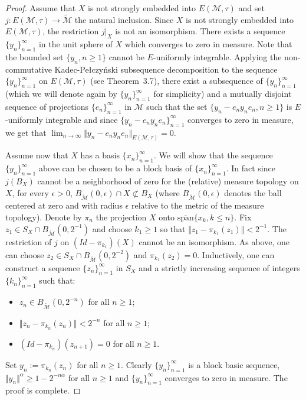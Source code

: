 \documentclass[12pt]{amsart}
\let\cal\mathcal
\def\m{{\cal M}}
\def\mt{\widetilde{\cal M}}
\def\nmt{\widetilde {\cal M}}
\numberwithin{equation}{section}
\numberwithin{theorem}{section}
\begin{document}
\begin{proof} Assume that $X$ is not strongly embedded into $E(\m,\tau)$
and set $j: E(\m,\tau) \rightarrow \nmt$ the natural inclusion.
Since $X$ is not strongly embedded into $E(\m,\tau)$, the restriction
$j\vert_{X}$ is not an isomorphism. There exists a sequence 
$\{y_n\}_{n=1}^\infty$ in
the unit sphere of $X$ which converges to zero in measure.
Note that the bounded set $\{y_n, n\geq 1\}$ cannot be $E$-uniformly integrable.
Applying the non-commutative Kadec-Pe\l czy\'nski subsequence 
decomposition to the sequence $\{y_n\}_{n=1}^\infty$ on  $E(\m,\tau)$ (see 
\cite{Ran10} Theorem~3.7), there exist a 
subsequence of $\{y_n\}_{n=1}^\infty$ 
(which we will denote again by $\{y_n\}_{n=1}^\infty$ for simplicity) and a mutually
disjoint sequence of projections $\{e_n\}_{n=1}^\infty$ in $\m$ such that
the set
$\{y_n -e_ny_ne_n, n\geq 1\}$ is $E$-uniformly integrable and since 
$\{y_n -e_ny_ne_n\}_{n=1}^\infty$ converges to zero in measure, we get that
$\lim_{n\to \infty} \Vert y_n-e_ny_ne_n\Vert_{E(\m,\tau)}=0$.

Assume now that $X$ has a basis $\{x_n\}_{n=1}^\infty$. We will show that the
sequence $\{y_n\}_{n=1}^\infty$ above can be chosen to be a block basis
 of $\{x_n\}_{n=1}^\infty$.
In fact since $j(B_X)$ cannot be a neighborhood of zero for the (relative)
measure topology on $X$, for every $\epsilon>0$,
$B_{\mt}(0,\epsilon) \cap X \not\subset B_X$ (where $B_{\mt}(0,\epsilon)$ denotes
the ball centered at zero and with radius $\epsilon$ relative to the metric
of the measure topology). Denote by $\pi_n$ the projection $X$ onto 
$\overline{\text{span}}\{ x_k, k\leq n\}$.
Fix $z_1 \in S_X \cap B_{\mt}(0, 2^{-1})$ and choose $k_1\geq 1$ so that 
$\Vert z_1 - \pi_{k_1}(z_1)\Vert <2^{-1}$.
The restriction of $j$ on $(Id-\pi_{k_1})(X)$ cannot be an isomorphism.
As above, one can choose $z_2 \in S_X \cap B_{\mt}(0, 2^{-2})$ and 
$\pi_{k_1}(z_2)=0$. Inductively, one can construct a sequence 
$\{z_n\}_{n=1}^\infty$
in $S_X$ and a strictly increasing sequence of integers 
$\{k_n\}_{n=1}^\infty$ such that:
\begin{itemize}
\item[(i)] $z_n \in B_{\mt}(0, 2^{-n})$ for all $n \geq 1$;
\item[(ii)] $\Vert z_n -\pi_{k_n}(z_n) \Vert < 2^{-n}$ for all $n\geq 1$;
\item[(iii)]  $(Id-\pi_{k_n})(z_{n+1})=0$ for all $n\geq 1$.
\end{itemize}
Set $y_n:= \pi_{k_n}(z_n)$ for all $n\geq 1$. Clearly 
$\{y_n\}_{n=1}^\infty$ is a block basic sequence, $\Vert y_n \Vert^\alpha
 \geq 1-2^{-n\alpha}$ for
all $n\geq 1$ and  $\{y_n\}_{n=1}^\infty$ converges to zero in measure. 
The proof is complete.
\end{proof}
\end{document}
